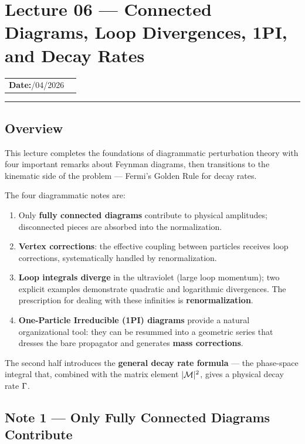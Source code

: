 \documentclass[../main.tex]{subfiles}
\begin{document}
\section{Lecture 06 — Connected Diagrams, Loop Divergences, 1PI, and Decay Rates}\label{sec:lec06:connected-1pi-decays}
\begin{center}
\begin{tabular}{ll}
  \textbf{Date:}\quad 26/04/2026   & \\
\end{tabular}
\end{center}
\hrule\vspace{1.5em}
\subsection*{Overview}

This lecture completes the foundations of diagrammatic perturbation theory with four important remarks about Feynman diagrams, then transitions to the kinematic side of the problem — Fermi's Golden Rule for decay rates.

The four diagrammatic notes are:
\begin{enumerate}
  \item Only \textbf{fully connected diagrams} contribute to physical amplitudes; disconnected pieces are absorbed into the normalization.
  \item \textbf{Vertex corrections}: the effective coupling between particles receives loop corrections, systematically handled by renormalization.
  \item \textbf{Loop integrals diverge} in the ultraviolet (large loop momentum); two explicit examples demonstrate quadratic and logarithmic divergences.  The prescription for dealing with these infinities is \textbf{renormalization}.
  \item \textbf{One-Particle Irreducible (1PI) diagrams} provide a natural organizational tool: they can be resummed into a geometric series that dresses the bare propagator and generates \textbf{mass corrections}.
\end{enumerate}

The second half introduces the \textbf{general decay rate formula} — the phase-space integral that, combined with the matrix element $|\mathcal{M}|^2$, gives a physical decay rate $\Gamma$.

\subsection*{Note 1 — Only Fully Connected Diagrams Contribute}
\end{document}
